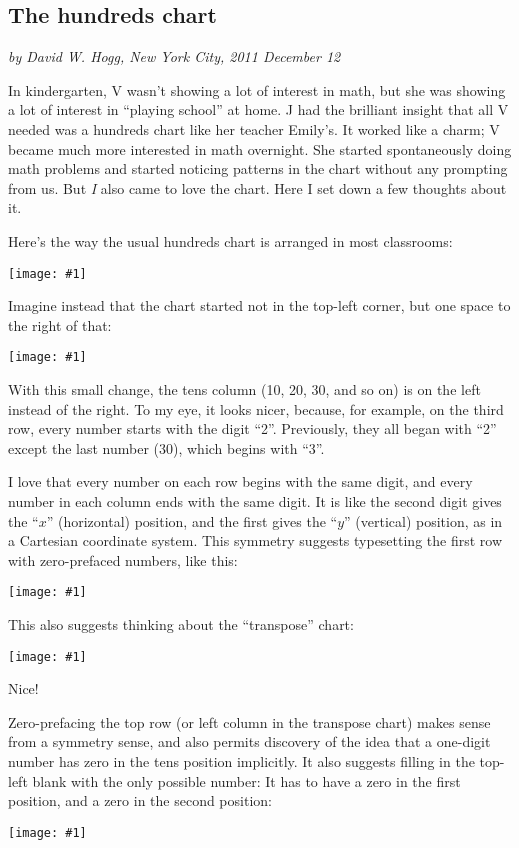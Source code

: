 \documentclass[12pt,pdftex]{article}
\newcommand{\showchart}[1]{\texttt{[image: \#1]}}
\begin{document}
\subsection*{The hundreds chart}

\noindent
\textsl{by David W. Hogg, New York City, 2011 December 12}
\vspace{1ex}

\noindent
In kindergarten, V wasn't showing a lot of interest in math, but she
was showing a lot of interest in ``playing school'' at home.  J had
the brilliant insight that all V needed was a hundreds chart like her
teacher Emily's.  It worked like a charm; V became much more
interested in math overnight.  She started spontaneously doing math
problems and started noticing patterns in the chart without any
prompting from us.  But \emph{I} also came to love the chart.  Here I
set down a few thoughts about it.

Here's the way the usual hundreds chart is arranged in most
classrooms:
\begin{center}
\showchart{hundreds_chart_standard.pdf}
\end{center}

Imagine instead that the chart started not in the top-left corner,
but one space to the right of that:
\begin{center}
\showchart{hundreds_chart_skipzero_nzp.pdf}
\end{center}
With this small change, the tens column (10, 20, 30, and so on) is on
the left instead of the right.  To my eye, it looks nicer, because,
for example, on the third row, every number starts with the digit
``2''.  Previously, they all began with ``2'' except the last number
(30), which begins with ``3''.

I love that every number on each row begins with the same digit, and
every number in each column ends with the same digit.  It is like the
second digit gives the ``$x$'' (horizontal) position, and the first
gives the ``$y$'' (vertical) position, as in a Cartesian coordinate
system.  This symmetry suggests typesetting the first row with
zero-prefaced numbers, like this:
\begin{center}
\showchart{hundreds_chart_skipzero.pdf}
\end{center}
This also suggests thinking about the ``transpose'' chart:
\begin{center}
\showchart{hundreds_chart_transpose_skipzero.pdf}
\end{center}
Nice!

Zero-prefacing the top row (or left column in the transpose chart)
makes sense from a symmetry sense, and also permits discovery of the
idea that a one-digit number has zero in the tens position implicitly.
It also suggests filling in the top-left blank with the only possible
number: It has to have a zero in the first position, and a zero in the
second position:
\begin{center}
\showchart{hundreds_chart_default.pdf}
\end{center}
\end{document}
